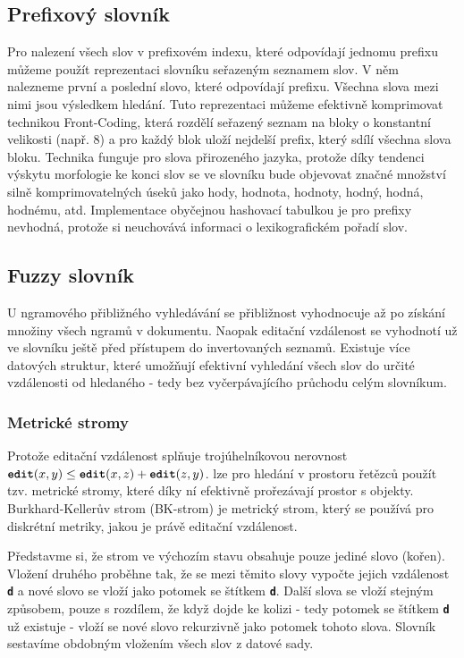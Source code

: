\documentclass[11pt,letterpaper,oneside,openright]{book}
\newcommand{\bftt}[1]{\texttt{\textbf{#1}}}
\begin{document}
\subsection{Prefixový slovník}
Pro nalezení všech slov v prefixovém indexu, které odpovídají jednomu prefixu
můžeme použít reprezentaci slovníku seřazeným seznamem slov. V něm nalezneme
první a poslední slovo, které odpovídají prefixu. Všechna slova mezi nimi jsou
výsledkem hledání.  Tuto reprezentaci můžeme efektivně komprimovat technikou
Front-Coding, která rozdělí seřazený seznam na bloky o konstantní velikosti
(např. 8) a pro každý blok uloží nejdelší prefix, který sdílí všechna slova
bloku. Technika funguje pro slova přirozeného jazyka, protože díky tendenci
výskytu morfologie ke konci slov se ve slovníku bude objevovat značné množství
silně komprimovatelných úseků jako hody, hodnota, hodnoty, hodný, hodná,
hodnému, atd. Implementace obyčejnou hashovací tabulkou je pro prefixy
nevhodná, protože si neuchovává informaci o lexikografickém pořadí slov.

\subsection{Fuzzy slovník}
U ngramového přibližného vyhledávání se přibližnost vyhodnocuje až po získání
množiny všech ngramů v dokumentu. Naopak editační vzdálenost se vyhodnotí už ve
slovníku ještě před přístupem do invertovaných seznamů. Existuje více datových
struktur, které umožňují efektivní vyhledání všech slov do určité vzdálenosti
od hledaného - tedy bez vyčerpávajícího průchodu celým slovníkum.

\subsubsection{Metrické stromy}
Protože editační vzdálenost splňuje trojúhelníkovou nerovnost $\bftt{edit}(x,y)
\leq \bftt{edit}(x,z) + \bftt{edit}(z,y)$. lze pro hledání v prostoru řetězců
použít tzv. metrické stromy, které díky ní efektivně prořezávají prostor s
objekty. Burkhard-Kellerův strom (BK-strom) je metrický strom, který se používá
pro diskrétní metriky, jakou je právě editační vzdálenost.

Představme si, že strom ve výchozím stavu obsahuje pouze jediné slovo (kořen).
Vložení druhého proběhne tak, že se mezi těmito slovy vypočte jejich vzdálenost
\bftt{d} a nové slovo se vloží jako potomek se štítkem \bftt{d}. Další slova se
vloží stejným způsobem, pouze s rozdílem, že když dojde ke kolizi - tedy
potomek se štítkem \bftt{d} už existuje - vloží se nové slovo rekurzivně jako
potomek tohoto slova. Slovník sestavíme obdobným vložením všech slov z datové sady.
\end{document}
